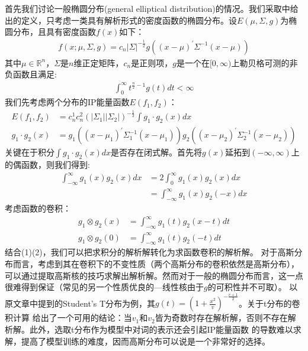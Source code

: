 \documentclass[13pt]{article}
\begin{document}
首先我们讨论一般椭圆分布(general elliptical distribution)的情况。我们采取\cite{gomez2003survey}中给出的定义，只考虑一类具有解析形式的密度函数的椭圆分布。设$E(\mu,\Sigma,g)$为椭圆分布，且具有密度函数$f(x)$如下：
\begin{align*}
f(x;\mu,\Sigma,g)=c_n|\Sigma|^{-\frac{1}{2}}g((x-\mu)^{\prime{}}\Sigma^{-1}(x-\mu))
\end{align*}
其中$\mu\in\mathbb{R}^n$，$\Sigma$是$n$维正定矩阵，$c_n$是正则项，$g$是一个在$[0,\infty)$上勒贝格可测的非负函数且满足:
\begin{align*}
\int_0^{\infty}t^{\frac{n}{2}-1}g(t)dt<\infty
\end{align*}
我们先考虑两个分布的IP能量函数$E(f_1,f_2)$：
\begin{align*}
E(f_1,f_2)&=c_n^1c_n^2(|\Sigma_1||\Sigma_2|)^{-\frac{1}{2}}\int g_1\cdot g_2(x)dx \\
g_1 \cdot g_2(x)&=g_1((x-\mu_1)^{\prime{}}\Sigma_1^{-1}(x-\mu_1))g_2((x-\mu_2)^{\prime{}}\Sigma_2^{-1}(x-\mu_2))
\end{align*}
关键在于积分$\int g_1\cdot g_2(x)dx$是否存在闭式解。首先将$g(x)$延拓到$(-\infty,\infty)$上的偶函数，则我们得到:
\begin{align*}
\int_{-\infty}^{\infty}g_1(x)g_2(x)dx&=2\int_{0}^{\infty}g_1(x)g_2(x)dx \\
&=\int_{-\infty}^{\infty}g_1(x)g_2(-x)dx
\end{align*}
考虑函数的卷积：
\begin{align*}
g_1\otimes g_2(x)&= \int_{-\infty}^{\infty} g_1(t)g_2(x-t)dt \\
g_1\otimes g_2(0)&= \int_{-\infty}^{\infty} g_1(t)g_2(-t)dt   
\end{align*}
结合(1)(2)，我们可以把求积分的解析解转化为求函数卷积的解析解。
对于高斯分布而言，考虑到其在卷积下的不变性质（两个高斯分布的卷积依然是高斯分布），可以通过提取高斯核的技巧求解出解析解。然而对于一般的椭圆分布而言，这一点很难得到保证（常见的另一个性质优良的---线性核由于$g$的可积性并不可取）。
以原文章中提到的Student's T分布为例，其$g(t)=(1+\frac{x^2}{v})^{-\frac{v+1}{2}}$。关于t分布的卷积计算
\cite{nadarajah2005convolutions}给出了一个可用的结论：当$v_1$和$v_2$皆为奇数时存在解析解，否则不存在解析解。此外，选取t分布作为模型中对词的表示还会引起IP能量函数
的导数难以求解，提高了模型训练的难度，因而高斯分布可以说是一个非常好的选择。
\end{document}
